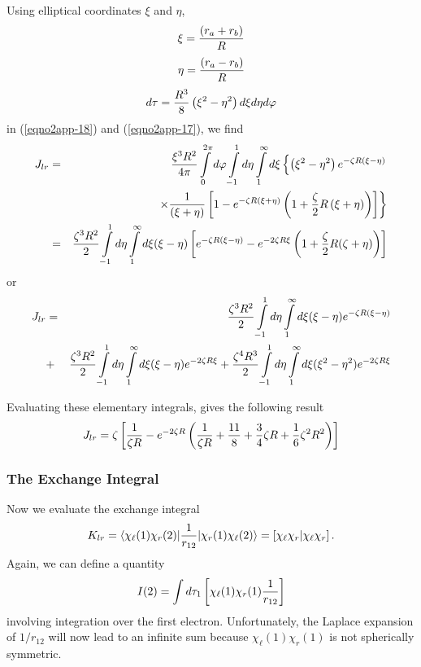Using elliptical coordinates $\xi$ and $\eta$,
\begin{equation}
\xi = {\left( r_a + r_b \right) \over R}
\end{equation}
\begin{equation}
\eta = {\left( r_a - r_b \right) \over R}
\end{equation}
\begin{equation}
d \tau = {R^3 \over 8} \left( \xi^2 - \eta^2 \right) d \xi d \eta d 
\varphi
\end{equation}
\noindent
in (\ref{eqno2app-18}) and (\ref{eqno2app-17}), we find
\begin{eqnarray*}
J_{lr} &=& {\xi^3 R^2 \over 4 \pi} \int\limits^{2 \pi}_{0} d \varphi 
\int\limits^{1}_{-1} d \eta \int\limits^{\infty}_{1} d \xi \left\{ 
\left( \xi^2 - \eta^2 \right) e^{- \zeta R(\xi - \eta)}\right.\cr
&& \left. \times {1 
\over ( \xi + \eta)} \left[ 1 - e^{- \zeta R(\xi + \eta)} \left( 1 + 
{\zeta \over 2} R \left( \xi + \eta \right) \right) \right] \right\}\cr
&=& {\zeta^3R^2 \over 2} \int\limits^{1}_{-1} d \eta 
\int\limits^{\infty}_{1} d \xi ( \xi - \eta) \left[ e^{- \zeta 
R(\xi-\eta)} - e^{-2\zeta R\xi} \left( 1 + {\zeta \over 2} R ( 
\zeta + \eta ) \right) \right]\cr
\end{eqnarray*}
or
\begin{eqnarray*}
J_{lr} &=& {\zeta^3R^2 \over 2} \int\limits^{1}_{-1} d \eta 
\int\limits^{\infty}_{1} d \xi ( \xi - \eta) e^{- \zeta 
R(\xi-\eta)}\cr
&+& {\zeta^3R^2 \over 2} \int\limits^{1}_{-1} d \eta 
\int\limits^{\infty}_{1} d \xi ( \xi - \eta) e^{- 2 \zeta R \xi} + 
{\zeta^4R^3 \over 2} \int\limits^{1}_{-1} d \eta 
\int\limits^{\infty}_{1} d \xi ( \xi^2 - \eta^2)
e^{- 2 \zeta R \xi}\cr
\end{eqnarray*}

Evaluating these elementary integrals, gives the following result
\begin{equation}
J_{lr} = \zeta \left[ {1 \over \zeta R} - e^{-2 \zeta R} \left( {1 
\over \zeta R} + {11 \over 8} + {3 \over 4} \zeta R + {1 \over 6} 
\zeta^2 R^2 \right) \right]
\end{equation}

\subsubsection{The Exchange Integral}

Now we evaluate the exchange integral
\begin{equation}
K_{lr} = \langle \chi_\ell ( 1 ) \chi_r ( 2 ) \vert {1 \over r_{12}} 
\vert \chi_r ( 1 ) \chi_\ell ( 2 ) \rangle = \left[ \chi_\ell \chi_r \vert 
\chi_\ell \chi_r \right] .
\end{equation}
Again, we can define a quantity
\begin{equation}
I(2)  = \int d \tau_1 \left[ \chi_\ell ( 1 ) \chi_r ( 1 ) {1 \over 
r_{12}} \right]
\end{equation}
involving integration over the first electron.  Unfortunately, the 
Laplace expansion of $1/r_{12}$ will now lead to an infinite sum 
because $\chi_\ell(1)\chi_r(1)$ is not spherically symmetric.
    
